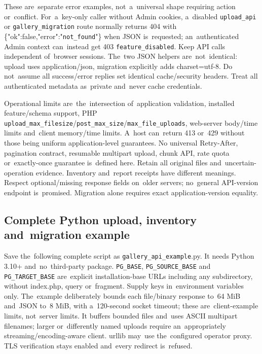 \documentclass[11pt,a4paper]{article}
\newcommand{\codeword}[1]{\nolinkurl{#1}}
\begin{document}
These are~separate error examples, not~a~universal shape requiring action or~conflict.
For~a~key-only caller without Admin cookies, a~disabled \codeword{upload_api} or
\codeword{gallery_migration} route normally returns 404 with
\{"ok":false,"error":"\codeword{not_found}"\} when JSON is~requested; an~authenticated Admin
context can~instead get 403 \codeword{feature_disabled}. Keep API calls independent
of~browser sessions. The~two JSON helpers are~not~identical: upload uses application/json,
migration explicitly adds charset=utf-8. Do not~assume all success/error replies set
identical cache/security headers. Treat all authenticated metadata as~private and~never
cache credentials.

Operational limits are~the~intersection of~application validation, installed feature/schema
support, PHP
\codeword{upload_max_filesize}/\codeword{post_max_size}/\codeword{max_file_uploads},
web-server body/time limits and~client memory/time limits. A~host can~return 413 or~429
without those being uniform application-level guarantees. No universal Retry-After,
pagination contract, resumable multipart upload, chunk API, rate quota or~exactly-once
guarantee is~defined here. Retain all original files and~uncertain-operation evidence.
Inventory and~report receipts have different meanings. Respect optional/missing response
fields on~older servers; no~general API-version endpoint is~promised. Migration alone
requires exact application-version equality.

\subsection{\texorpdfstring{Complete Python upload, inventory and~migration example}{Complete Python upload, inventory and migration example}}

\label{api352:complete-client}

Save the~following complete script as \codeword{gallery_api_example}.py. It needs Python
3.10+ and~no~third-party package. \codeword{PG_BASE}, \codeword{PG_SOURCE_BASE} and
\codeword{PG_TARGET_BASE} are~explicit installation-base URLs including any subdirectory,
without index.php, query or~fragment. Supply keys in~environment variables only. The~example
deliberately bounds each file/binary response to~64 MiB and~JSON to~8 MiB, with a~120-second
socket timeout; these are~client-example limits, not~server limits. It buffers bounded files
and~uses ASCII multipart filenames; larger or~differently named uploads require
an~appropriately streaming/encoding-aware client. urllib may~use the~configured operator
proxy. TLS verification stays enabled and~every redirect is~refused.
\end{document}
